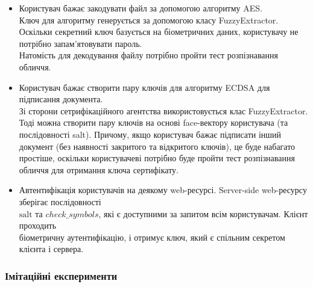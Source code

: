 \documentclass[11pt]{article}
\providecommand{\tightlist}{%
      \setlength{\itemsep}{0pt}\setlength{\parskip}{0pt}}
\begin{document}
\begin{itemize}
\tightlist
\item
  Користувач бажає закодувати файл за допомогою алгоритму AES.\\
  Ключ для алгоритму генерується за допомогою класу FuzzyExtractor.
  Оскільки секретний ключ базується на біометричних даних, користувачу
  не потрібно запам'ятовувати пароль.\\
  Натомість для декодування файлу потрібно пройти тест розпізнавання
  обличчя.
\item
  Користувач бажає створити пару ключів для алгоритму ECDSA для
  підписання документа.\\
  Зі сторони сетрифікаційного агентства використовується клас
  FuzzyExtractor.\\
  Тоді можна створити пару ключів на основі face-вектору користувача (та
  послідовності salt). Причому, якщо користувач бажає підписати інший
  документ (без наявності закритого та відкритого ключів), це буде
  набагато простіше, оскільки користувачеві потрібно буде пройти тест
  розпізнавання обличчя для отримання ключа сертифікату.
\item
  Автентифікація користувачів на деякому web-ресурсі. Server-side
  web-ресурсу зберігає послідовності\\
  \(\text{salt}\) та \(check\_symbols\), які є доступними за
  запитом всім користувачам. Клієнт проходить\\
  біометричну аутентифікацію, і отримує ключ, який є спільним секретом
  клієнта і сервера.
\end{itemize}

    \hypertarget{ux456ux43cux456ux442ux430ux446ux456ux439ux43dux456-ux435ux43aux441ux43fux435ux440ux438ux43cux435ux43dux442ux438}{%
\subsubsection{Імітаційні
експерименти}\label{ux456ux43cux456ux442ux430ux446ux456ux439ux43dux456-ux435ux43aux441ux43fux435ux440ux438ux43cux435ux43dux442ux438}}
\end{document}
